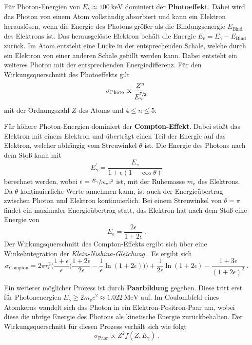 Für Photon-Energien von $E_{\gamma} \approx \SI{100}{\kilo\eV}$ dominiert der \textbf{Photoeffekt}.
Dabei wird das Photon von einem Atom vollständig absorbiert und kann ein Elektron herauslösen,
wenn die Energie des Photons größer als die Bindungsenergie $E_\text{Bind}$ des Elektrons ist.
Das herausgelöste Elektron behält die Energie $E_\text{e} = E_{\gamma} - E_\text{Bind}$ zurück.
Im Atom entsteht eine Lücke in der entsprechenden Schale,
welche durch ein Elektron von einer anderen Schale gefüllt werden kann.
Dabei entsteht ein weiteres Photon mit der entsprechenden Energiedifferenz.
Für den Wirkungsquerschnitt des Photoeffekts gilt
\begin{equation*}
    \sigma_\text{Photo} \propto \frac{Z^n}{E^{\sfrac{7}{2}}_{\gamma}}
\end{equation*}
mit der Ordnungszahl $Z$ des Atoms und $4 \leq n \leq \num{5}$.

Für höhere Photon-Energien dominiert der \textbf{Compton-Effekt}.
Dabei stößt das Elektron mit einem Elektron und überträgt einen Teil der Energie auf das Elektron,
welcher abhängig vom Streuwinkel $\theta$ ist.
Die Energie des Photons nach dem Stoß kann mit
\begin{equation*}
    E^{'}_{\gamma} = \frac{E_{\gamma}}{1 + \epsilon(1 - \cos{\theta})}
\end{equation*}
berechnet werden,
wobei $\epsilon = \sfrac{E_{\gamma}}{m_\text{e} c^2}$ ist,
mit der Ruhemasse $m_\text{e}$ des Elektrons.
Da $\theta$ kontinuierliche Werte annehmen kann,
ist auch der Energieübertrag zwischen Photon und Elektron kontinuierlich.
Bei einem Streuwinkel von $\theta = \pi$ findet ein maximaler Energieübertrag statt,
das Elektron hat nach dem Stoß eine Energie von
\begin{equation*}
    E_\text{e} = \frac{2 \epsilon}{1 + 2 \epsilon} \ .
\end{equation*}
Der Wirkungsquerschnitt des Compton-Effekts ergibt sich über eine Winkelintegration der \emph{Klein-Nishina-Gleichung} \cite{knoll}.
Es ergibt sich
\begin{equation}
    \sigma_\text{Compton} =
    2 \pi r^2_\text{e} \biggl(\frac{1+\epsilon}{\epsilon} \biggl(\frac{1+2\epsilon}{2\epsilon} - \frac{1}{\epsilon}\ln(1+2\epsilon)\biggr)\biggr)
    + \frac{1}{2\epsilon} \ln(1+2\epsilon) - \frac{1+3\epsilon}{(1+2\epsilon)^2} \ .
\end{equation}

Ein weiterer möglicher Prozess ist durch \textbf{Paarbildung} gegeben.
Diese tritt erst für Photonenergien $E_{\gamma} \geq 2 m_\text{e} c^2 \approx \SI{1.022}{\mega\eV}$ auf.
Im Coulombfeld eines Atomkerns wandelt sich das Photon in ein Elektron-Positron-Paar um,
wobei diese die übrige Energie des Photons als kinetische Energie zurückbehalten.
Der Wirkungsquerschnitt für diesen Prozess verhält sich wie folgt
\begin{equation*}
    \sigma_\text{Paar} \propto Z^2 f(Z, E_{\gamma}) \ .
\end{equation*}


